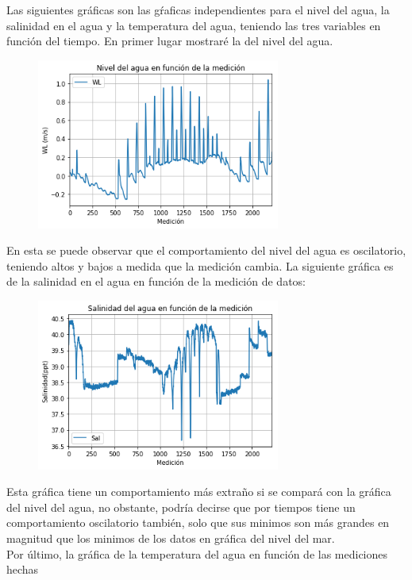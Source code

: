 \documentclass{article}
\begin{document}
\vspace*{0.5in}

Las siguientes gráficas son las gŕaficas independientes para el nivel del agua, la salinidad en el agua y la temperatura del agua, teniendo las tres variables en función del tiempo. En primer lugar mostraré la del nivel del agua. 

\begin{figure}[htb]
    \begin{center}
    \includegraphics[width=8cm]{AguaMedicion.png}
    \end{center}
\end{figure}    

En esta se puede observar que el comportamiento del nivel del agua es oscilatorio, teniendo altos y bajos a medida que la medición cambia.
La siguiente gráfica es de la salinidad en el agua en función de la medición de datos: 

\begin{figure}[htb]
    \begin{center}
    \includegraphics[width=8cm]{SalinidadMedicion.png}
    \end{center}
\end{figure}    

Esta gráfica tiene un comportamiento más extraño si se compará con la gráfica del nivel del agua, no obstante, podría decirse que por tiempos tiene un comportamiento oscilatorio también, solo que sus minimos son más grandes en magnitud que los minimos de los datos en gráfica del nivel del mar. \\
Por último, la gráfica de la temperatura del agua en función de las mediciones hechas 
\end{document}
